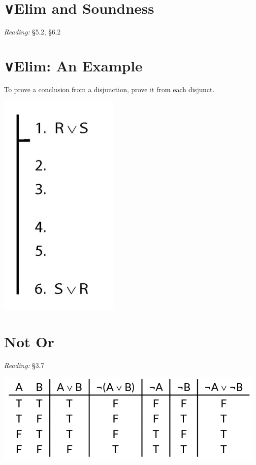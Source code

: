 \documentclass[12pt]{extarticle}
\begin{document}
\begin{multicols*}{3}
 
\section{∨Elim and Soundness}
 
\emph{Reading:} §5.2, §6.2
 
 
 
\section{∨Elim: An Example}
 
To prove a conclusion from a disjunction, prove it from each disjunct.
 
\begin{center}
\includegraphics[scale=0.3]{img/proof_disjunction_elim.png}
\end{center}


\vfill
\columnbreak
 
 
\section{Not Or}
 
\emph{Reading:} §3.7
 
\begin{center}
\includegraphics[scale=0.3]{img/tt_unit_603.png}
\end{center}
 

\end{multicols*}
\end{document}

